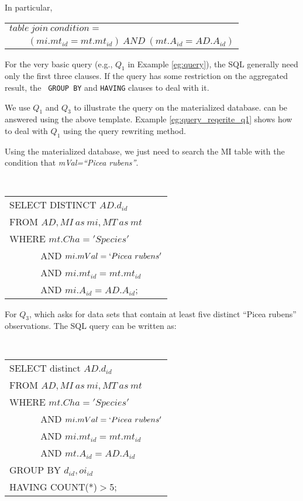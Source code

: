 In particular,

\vspace{0.1in}
\begin{tabular}{l}
$table~join~condition=$\\
$\qquad (mi.mt_{id}=mt.mt_{id})~AND~(mt.A_{id}=AD.A_{id})$
\end{tabular}
\vspace{0.1in}

For the very basic query (e.g., $Q_1$ in Example \ref{eg:query}), the
SQL generally need only the first three clauses.
If the query has some restriction on the aggregated result, the {\tt
  GROUP BY} and {\tt HAVING} clauses to deal with it.

We use $Q_1$ and $Q_3$ to illustrate the query on the materialized
database.
can be answered using the above
template.
Example \ref{eg:query_reqerite_q1} shows how to deal with $Q_1$ using
the query rewriting method.

\begin{example} \label{eg:materialize_db_q1}
Using the  materialized database,  we just need to search the MI table
with the condition that {\em mVal=``Picea rubens''}.

\vspace{0.1in}
{\tt
\begin{tabular}{l}
SELECT DISTINCT $AD.d_{id}$\\
FROM $AD, MI~as~mi, MT~as~mt$\\
WHERE $mt.Cha='Species'$ \\
$\qquad\quad$ AND $mi.mVal = `Picea~rubens'$\\
$\qquad\quad$ AND $mi.mt_{id}=mt.mt_{id}$\\
$\qquad\quad$ AND $mi.A_{id}=AD.A_{id}$;
\end{tabular}
}
\vspace{0.1in}

For $Q_3$, which asks for data sets that contain at
least five distinct ``Picea rubens'' observations.
The SQL query can be written as:

\vspace{0.1in}
{\tt
\begin{tabular}{l}
SELECT distinct $AD.d_{id}$\\
FROM $AD, MI~as~mi, MT~as~mt$\\
WHERE $mt.Cha='Species'$ \\
$\qquad\quad$ AND $mi.mVal = `Picea~rubens'$\\
$\qquad\quad$ AND $mi.mt_{id}=mt.mt_{id}$\\
$\qquad\quad$ AND $mt.A_{id}=AD.A_{id}$\\
GROUP BY $d_{id},oi_{id}$\\
HAVING COUNT(*)$>$5;
\end{tabular}
}
\vspace{0.1in}
\end{example}

